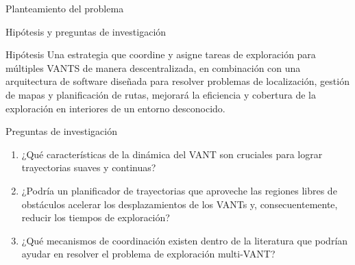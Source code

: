 \documentclass[24pt,aspectratio=169]{beamer}
\begin{document}
\begin{frame}[fragile]{Planteamiento del problema}
\end{frame}

\begin{frame}{Hipótesis y preguntas de investigación}
  
  \begin{block}{Hipótesis}
    \vspace{1mm}
    \small Una estrategia que coordine y asigne tareas de exploración para múltiples VANTS de manera descentralizada, en combinación con una arquitectura de software diseñada para resolver problemas de localización, gestión de mapas y planificación de rutas, mejorará la eficiencia y cobertura de la exploración en interiores de un entorno desconocido.
  \end{block}
  \pause
  \begin{block}{Preguntas de investigación}
    \small{
      \begin{enumerate}
      \item ¿Qué características de la dinámica del VANT son cruciales para lograr trayectorias suaves y continuas?
      \item ¿Podría un planificador de trayectorias que aproveche las regiones libres de obstáculos acelerar los desplazamientos de los VANTs y, consecuentemente, reducir los tiempos de exploración?
      \item ¿Qué mecanismos de coordinación existen dentro de la literatura que podrían ayudar en resolver el problema de exploración multi-VANT?
      \end{enumerate}
    }
  \end{block}
\end{frame}
\end{document}
